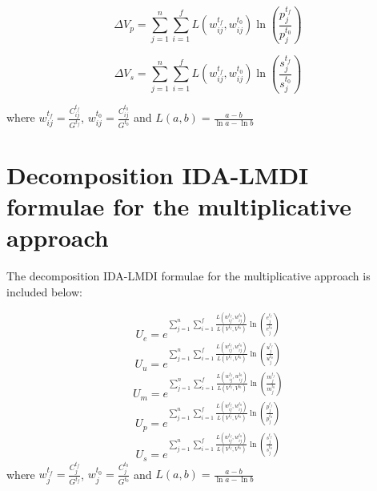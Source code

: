 \documentclass[energies,article,accept,moreauthors,12pt,a4paper]{mdpi} %
\begin{document}
\begin{equation}\label{dvtot4}
  \Delta V_{p}   = \sum^n_{j=1} \sum^f_{i=1}   L(w_{ij}^{t_f},w_{ij}^{t_0}) \ln(\frac{p^{t_f}_{j}}{p^{t_0}_{j}})
\end{equation}

\begin{equation}\label{dvtot5}
  \Delta V_{s}   = \sum^n_{j=1} \sum^f_{i=1}   L(w_{ij}^{t_f},w_{ij}^{t_0}) \ln(\frac{s^{t_f}_{j}}{s^{t_0}_{j}})
\end{equation}

where $w^{t_f}_{ij}=\frac{C^{t_f}_{ij}}{G^{t_f}}$, $w^{t_0}_{ij}=\frac{C^{t_0}_{ij}}{G^{t_0}}$ and
$L(a,b)=\frac{a-b}{\ln{a}-\ln{b}}$


\section{Decomposition IDA-LMDI formulae for the multiplicative approach}\label{app2}

The decomposition IDA-LMDI formulae for the multiplicative approach is included below:

\begin{equation}
  U_{e}   = e^{\sum^n_{j=1}\sum^f_{i=1}
  \frac{L(w_{ij}^{t_f},w_{ij}^{t_0})} {L(V^{t_f},V^{t_0})}\ln(\frac{e^{t_f}_{j}}{e^{t_0}_{j}})}
\end{equation}
\begin{equation}
  U_{u}   = e^{\sum^n_{j=1} \sum^f_{i=1}
  \frac{L(w_{ij}^{t_f},w_{ij}^{t_0})} {L(V^{t_f},V^{t_0})}\ln(\frac{u^{t_f}_{j}}{u^{t_0}_{j}})}
\end{equation}
\begin{equation}
  U_{m}   = e^{\sum^n_{j=1}\sum^f_{i=1}
  \frac{L(w_{ij}^{t_f},w_{ij}^{t_0})} {L(V^{t_f},V^{t_0})}\ln(\frac{m^{t_f}_{j}}{m^{t_0}_{j}})}
\end{equation}
\begin{equation}
  U_{p}   = e^{\sum^n_{j=1}\sum^f_{i=1}
  \frac{L(w_{ij}^{t_f},w_{ij}^{t_0})} {L(V^{t_f},V^{t_0})}\ln(\frac{p^{t_f}_{j}}{p^{t_0}_{j}})}
\end{equation}
\begin{equation}
  U_{s}   = e^{\sum^n_{j=1} \sum^f_{i=1}
  \frac{L(w_{ij}^{t_f},w_{ij}^{t_0})} {L(V^{t_f},V^{t_0})}\ln(\frac{s^{t_f}_{j}}{s^{t_0}_{j}})}
\end{equation}
where $w^{t_f}_{j}=\frac{C^{t_f}_{j}}{G^{t_f}}$, $w^{t_0}_{j}=\frac{C^{t_0}_{j}}{G^{t_0}}$ and
$L(a,b)=\frac{a-b}{\ln{a}-\ln{b}}$
\end{document}
